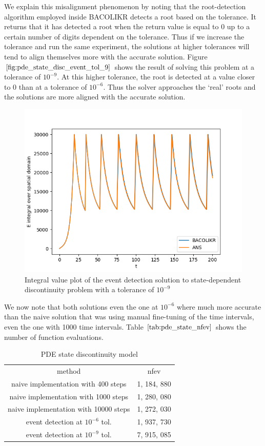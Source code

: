 \documentclass{article}
\begin{document}
We explain this misalignment phenomenon by noting that the root-detection algorithm employed inside BACOLIKR detects a root based on the tolerance. It returns that it has detected a root when the return value is equal to 0 up to a certain number of digits dependent on the tolerance. Thus if we increase the tolerance and run the same experiment, the solutions at higher tolerances will tend to align themselves more with the accurate solution. Figure $\ref{fig:pde_state_disc_event_tol_9}$ shows the result of solving this problem at a tolerance of $10^{-9}$. At this higher tolerance, the root is detected at a value closer to 0 than at a tolerance of $10^{-6}$. Thus the solver approaches the `real' roots and the solutions are more aligned with the accurate solution.


\begin{figure}[H]
\centering
\includegraphics[width=0.7\linewidth]{./figures/pde_state_disc_event_tol_9}
\caption{Integral value plot of the event detection solution to state-dependent discontinuity problem with a tolerance of $10^{-9}$}
\label{fig:pde_state_disc_event_tol_9}
\end{figure}

We now note that both solutions even the one at $10^{-6}$ where much more accurate than the naive solution that was using manual fine-tuning of the time intervals, even the one with 1000 time intervals. Table $\ref{tab:pde_state_nfev}$ shows the number of function evaluations. 

\begin{table}[h]
\caption {PDE state discontinuity model} 
\label{tab:pde_state_nfev}
\begin{center}
\begin{tabular}{ c c } 
method                                & nfev \\ 
naive implementation with 400 steps   & 1, 184, 880   \\
naive implementation with 1000 steps  & 1, 280, 080    \\
naive implementation with 10000 steps & 1, 272, 030    \\
event detection at $10^{-6}$ tol.     & 1, 937, 730    \\
event detection at $10^{-9}$ tol.     & 7, 915, 085    \\
\end{tabular}
\end{center}
\end{table}
\end{document}
